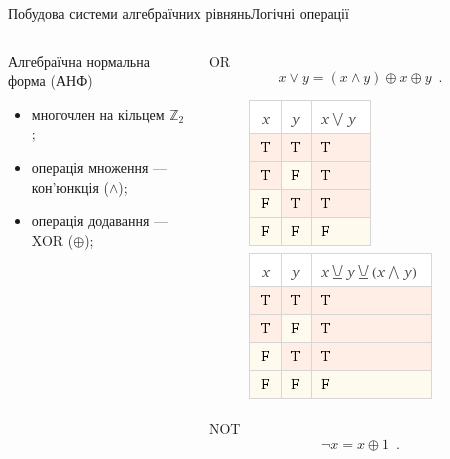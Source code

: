 \documentclass[10pt, ucs]{beamer}
\begin{document}
\begin{frame}{Побудова системи алгебраїчних рівнянь}{Логічні операції}
    \begin{columns}
        \begin{column}{0.5\textwidth}
            \begin{block}{Алгебраїчна нормальна форма (АНФ)}
                \begin{itemize}
                    \item многочлен на кільцем $\mathbb{Z}_2$;
                    \item операція множення --- \\ кон'юнкція ($\land$);
                    \item операція додавання --- \\ XOR ($\oplus$);
                \end{itemize}
            \end{block}
        \end{column}%
        \begin{column}{0.55\textwidth}
            \begin{block}{ OR}
                \Large
                \begin{equation}
                    \nonumber
                    x \lor y = (x \land y) \oplus x \oplus y\enspace.
                \end{equation}
                \begin{figure}[htbp]
                    \centering
                    \includegraphics[scale=0.5]{eq_logic_or} \hspace{3pt}
                    \includegraphics[scale=0.5]{eq_logic_or_anf}
                \end{figure}
            \end{block}

            \begin{block}{ NOT}
                \Large
                \begin{equation}
                    \nonumber
                    \neg x = x \oplus 1 \enspace.
                \end{equation}
            \end{block}
        \end{column}
    \end{columns}
\end{frame}
\end{document}
